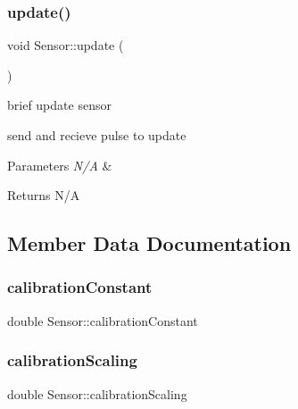 \mbox{\label{class_sensor_a542a721041768395de2c6e9012622113}} 
\subsubsection{\texorpdfstring{update()}{update()}\hspace{0.1cm}{\footnotesize\ttfamily [2/2]}}
{\footnotesize\ttfamily void Sensor\+::update (\begin{DoxyParamCaption}{ }\end{DoxyParamCaption})}



brief update sensor 

send and recieve pulse to update


\begin{DoxyParams}{Parameters}
{\em N/A} & \\
\hline
\end{DoxyParams}
\begin{DoxyReturn}{Returns}
N/A 
\end{DoxyReturn}


\subsection{Member Data Documentation}
\mbox{\label{class_sensor_a370acf36d39381aa3052c84e2d9f8443}} 
\subsubsection{\texorpdfstring{calibration\+Constant}{calibrationConstant}}
{\footnotesize\ttfamily double Sensor\+::calibration\+Constant\hspace{0.3cm}{\ttfamily [private]}}

\mbox{\label{class_sensor_a36d68507776088618b17ed25ac8d018c}} 
\subsubsection{\texorpdfstring{calibration\+Scaling}{calibrationScaling}}
{\footnotesize\ttfamily double Sensor\+::calibration\+Scaling\hspace{0.3cm}{\ttfamily [private]}}

